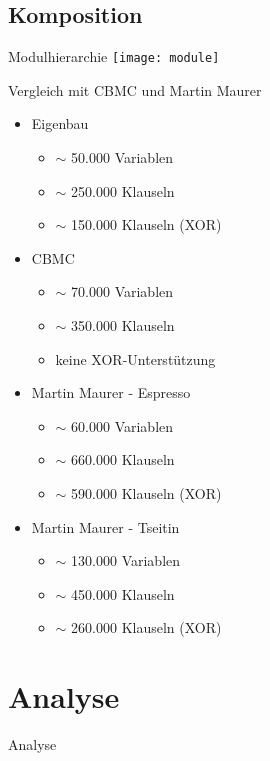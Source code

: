 \documentclass{beamer}
\begin{document}
  \subsection{Komposition}
  \begin{frame}{Modulhierarchie}
     \texttt{[image: module]}
  \end{frame}
  \begin{frame}{Vergleich mit CBMC und Martin Maurer}
    \begin{multicols}{2}
      \begin{itemize}
        \setlength{\itemsep}{20pt}
	\item Eigenbau
	\begin{itemize}
	  \item $ \sim $ 50.000 Variablen
	  \item $ \sim $ 250.000 Klauseln
	  \item $ \sim $ 150.000 Klauseln (XOR)
	\end{itemize}
	\item CBMC
	\begin{itemize}
	  \item $ \sim $ 70.000 Variablen
	  \item $ \sim $ 350.000 Klauseln
	  \item keine XOR-Unterstützung
	\end{itemize}
	\item Martin Maurer - Espresso
	\begin{itemize}
	  \item $ \sim $ 60.000 Variablen
	  \item $ \sim $ 660.000 Klauseln
	  \item $ \sim $ 590.000 Klauseln (XOR)
	\end{itemize}
	\item Martin Maurer - Tseitin
	\begin{itemize}
	  \item $ \sim $ 130.000 Variablen
	  \item $ \sim $ 450.000 Klauseln
	  \item $ \sim $ 260.000 Klauseln (XOR)
	\end{itemize}
      \end{itemize}
    \end{multicols}
  \end{frame}

\section{Analyse}
  \begin{frame}{}
    \begin{center}
      \Huge Analyse
    \end{center}
  \end{frame}
\end{document}
